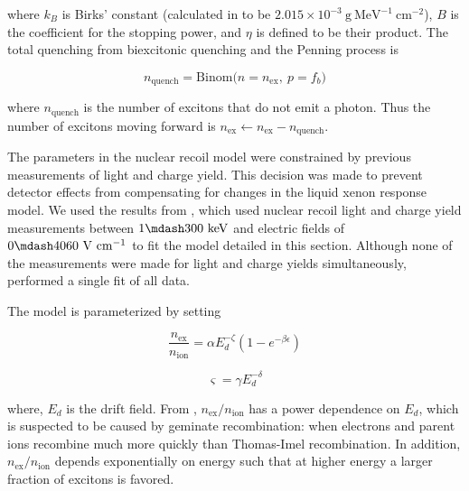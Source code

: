 \noindent where $k_B$ is Birks' constant (calculated in  to be $2.015 \times 10^{-3}\ \mathrm{g\ MeV^{-1}\ cm^{-2}}$),
$B$ is the coefficient for the stopping power, and $\eta$ is defined to be their product.  The total quenching from biexcitonic
quenching and the Penning process is

\begin{equation}
n_{\mathrm{quench}} = \mathrm{Binom} \big( n = n_{\mathrm{ex}},\ p = f_b \big)
\end{equation}

\noindent where $n_{\mathrm{quench}}$ is the number of excitons that do not emit a photon.  Thus the number of excitons moving forward
is $n_{\mathrm{ex}} \leftarrow n_{\mathrm{ex}} - n_{\mathrm{quench}}$.

The parameters in the nuclear recoil model were constrained by previous measurements of light and charge
yield.  This decision was made to prevent detector effects from compensating for changes
in the liquid xenon response model.  We used the results from , which used nuclear recoil light and charge yield
measurements between $1 \mdash 300\ \mathrm{keV}$ and electric fields of $0 \mdash 4060\ \mathrm{V\ cm^{-1}}$ to fit the model
detailed in this section.  Although none of the measurements were made for light and charge yields simultaneously, 
performed a single fit of all data.

The model is parameterized by setting

\vspace{-5pt}

\begin{equation}
\frac{n_{\mathrm{ex}}}{n_{\mathrm{ion}}} = \alpha E_{d}^{-\zeta} ( 1 - e^{-\beta \epsilon})
\label{eq:er_nr_calibrations_parameter_determ_nr_nex_nion}
\end{equation}

\vspace{-15pt}

\begin{equation}
\varsigma = \gamma E_{d}^{- \delta}
\label{eq:er_nr_calibrations_parameter_determ_nr_recomb_sigma}
\end{equation}

\noindent where, $E_d$ is the drift field.  From ,
$n_{\mathrm{ex}} / n_{\mathrm{ion}}$ has a power dependence on $E_d$,
which is suspected to be caused by geminate recombination: when electrons and parent ions recombine much more quickly than Thomas-Imel
recombination.  In addition, $n_{\mathrm{ex}} / n_{\mathrm{ion}}$ depends exponentially on energy such that at higher energy a larger
fraction of excitons is favored.

